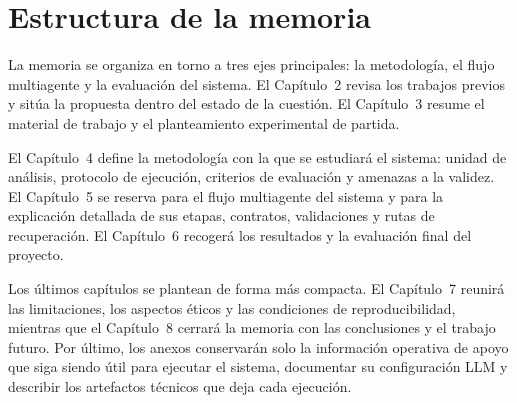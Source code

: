 \section{Estructura de la memoria}

La memoria se organiza en torno a tres ejes principales: la metodolog\'ia, el flujo multiagente y la evaluaci\'on del sistema. El Cap\'itulo~2 revisa los trabajos previos
y sit\'ua la propuesta dentro del estado de la cuesti\'on. El Cap\'itulo~3 resume el material de trabajo y el planteamiento experimental de partida.

El Cap\'itulo~4 define la metodolog\'ia con la que se estudiar\'a el sistema: unidad de an\'alisis, protocolo de ejecuci\'on, criterios de evaluaci\'on y amenazas a la
validez. El Cap\'itulo~5 se reserva para el flujo multiagente del sistema y para la explicaci\'on detallada de sus etapas, contratos, validaciones y rutas de
recuperaci\'on. El Cap\'itulo~6 recoger\'a los resultados y la evaluaci\'on final del proyecto.

Los \'ultimos cap\'itulos se plantean de forma m\'as compacta. El Cap\'itulo~7 reunir\'a las limitaciones, los aspectos \'eticos y las condiciones de reproducibilidad,
mientras que el Cap\'itulo~8 cerrar\'a la memoria con las conclusiones y el trabajo futuro. Por \'ultimo, los anexos conservar\'an solo la informaci\'on operativa de
apoyo que siga siendo \'util para ejecutar el sistema, documentar su configuraci\'on LLM y describir los artefactos t\'ecnicos que deja cada ejecuci\'on.
